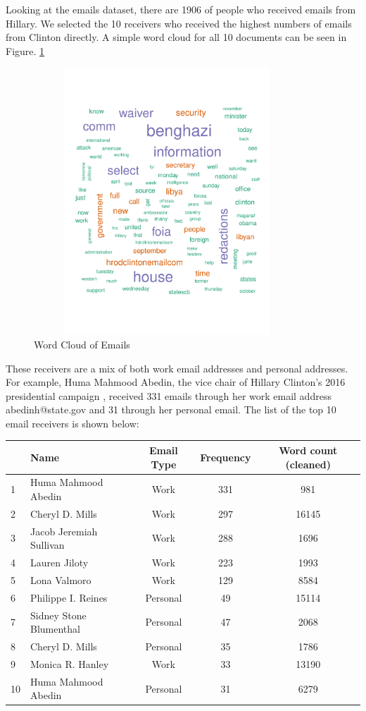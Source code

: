 Looking at the emails dataset, there are 1906 of people who received emails from Hillary. We selected the 10 receivers who received the highest numbers of emails from Clinton directly.
A simple word cloud for all 10 documents can be seen in Figure. \ref{fig:wcloud}
\begin{figure}[h!]
    \centering
    \includegraphics[width=10cm,height=10cm]
    {daitong_and_yihe/wcloud}
    \caption{Word Cloud of Emails}
    \label{fig:wcloud}
\end{figure}

These receivers are a mix of both work email addresses and personal addresses. For example, Huma Mahmood Abedin, the vice chair of Hillary Clinton's 2016 presidential campaign \cite{huma2016}, received 331 emails through her work email address abedinh@state.gov and 31 through her personal email. 
The list of the top 10 email receivers is shown below:
\begin{center}
  \begin{tabular}{ |l| l | c | c |c|}
    \hline
    &Name & Email Type & Frequency & Word count (cleaned)\\ \hline
    1&Huma Mahmood Abedin & Work & 331 & 981 \\ \hline
    2&Cheryl D. Mills & Work & 297 &16145 \\ \hline
    3&Jacob Jeremiah Sullivan & Work & 288 & 1696\\ \hline
    4&Lauren Jiloty & Work & 223 &1993\\ \hline
    5&Lona Valmoro & Work & 129 &8584\\ \hline
    6&Philippe I. Reines & Personal & 49 &15114\\ \hline
    7&Sidney Stone Blumenthal & Personal & 47 &2068\\ \hline
    8&Cheryl D. Mills & Personal & 35 &1786\\ \hline
    9&Monica R. Hanley & Work & 33 &13190\\ \hline
    10&Huma Mahmood Abedin & Personal & 31&6279 \\
    \hline
  \end{tabular}
\end{center}

